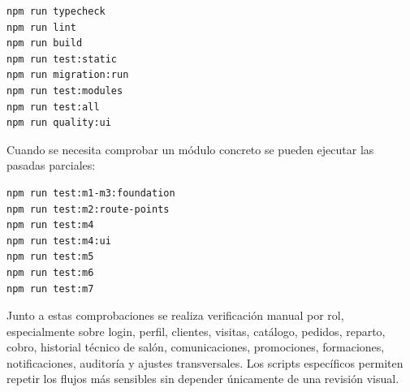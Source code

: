 \begin{lstlisting}[language=bash]
npm run typecheck
npm run lint
npm run build
npm run test:static
npm run migration:run
npm run test:modules
npm run test:all
npm run quality:ui
\end{lstlisting}

Cuando se necesita comprobar un módulo concreto se pueden ejecutar las pasadas parciales:

\begin{lstlisting}[language=bash]
npm run test:m1-m3:foundation
npm run test:m2:route-points
npm run test:m4
npm run test:m4:ui
npm run test:m5
npm run test:m6
npm run test:m7
\end{lstlisting}

Junto a estas comprobaciones se realiza verificación manual por rol, especialmente sobre login, perfil, clientes, visitas, catálogo, pedidos, reparto, cobro, historial técnico de salón, comunicaciones, promociones, formaciones, notificaciones, auditoría y ajustes transversales. Los scripts específicos permiten repetir los flujos más sensibles sin depender únicamente de una revisión visual.
